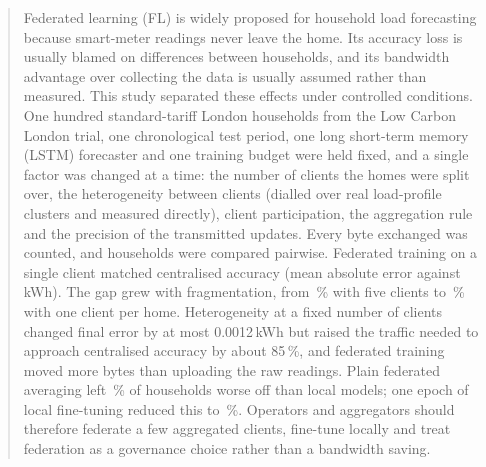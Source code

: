 
\begin{abstract}
Federated learning (FL) is widely proposed for household load forecasting because smart-meter readings never leave
the home. Its accuracy loss is usually blamed on differences between households, and its bandwidth
advantage over collecting the data is usually assumed rather than measured. This study separated these effects under
controlled conditions. One hundred standard-tariff London households from the Low Carbon London trial, one
chronological test period, one long short-term memory (LSTM) forecaster and one training budget were held fixed, and a
single factor was changed at a time: the number of clients the homes were split over, the heterogeneity between
clients (dialled over real load-profile clusters and measured directly), client participation, the
aggregation rule and the precision of the transmitted updates. Every byte exchanged was counted, and households were
compared pairwise. Federated training on a single client matched centralised accuracy (mean
absolute error \EonefourfedavgKoneMAE{} against \EtwocentralizedMAE{}\,kWh). The gap grew with fragmentation, from
\nosign{\EonefourfedavgKfiveGap}\,\% with five clients to \nosign{\EonethreefedavghouseholdGap}\,\% with one client
per home. Heterogeneity at a fixed number of clients changed final error by at most 0.0012\,kWh but raised the traffic
needed to approach centralised accuracy by about 85\,\%, and federated training moved more bytes than uploading the
raw readings. Plain federated averaging left \EqEfourfedavgmoderateHarmed{}\,\% of households worse off than local
models; one epoch of local fine-tuning reduced this to \EqEfourfedavgmoderateFTHarmed{}\,\%. Operators and aggregators
should therefore federate a few aggregated clients, fine-tune locally and treat federation as a governance
choice rather than a bandwidth saving.
\end{abstract}

